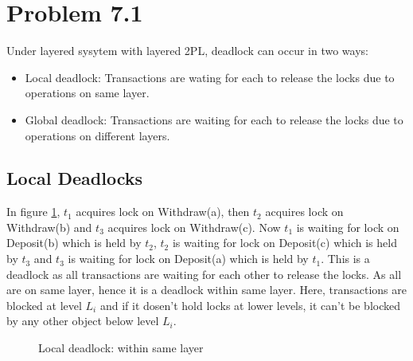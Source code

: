 \documentclass[12pt]{article}
\begin{document}
\section*{Problem 7.1}
Under layered sysytem with layered 2PL, deadlock can occur in two ways:
\begin{itemize}
    \item Local deadlock: Transactions are wating for each to release the locks due to operations on same layer.
    \item Global deadlock: Transactions are waiting for each to release the locks due to operations on different layers.
\end{itemize}
\subsection*{Local Deadlocks}
In figure \ref{fig:d1}, $t_1$ acquires lock on Withdraw(a), then $t_2$ acquires lock on Withdraw(b) and $t_3$ acquires lock on Withdraw(c).
Now $t_1$ is waiting for lock on Deposit(b) which is held by $t_2$, $t_2$ is waiting for lock on Deposit(c) which is held by $t_3$ and $t_3$ is waiting for lock on Deposit(a) which is held by $t_1$.
This is a deadlock as all transactions are waiting for each other to release the locks. As all are on same layer, hence it is a deadlock within same layer.
Here, transactions are blocked at level $L_i$ and if it dosen't hold locks at lower levels, it can't be blocked by any other object below level $L_i$.
\begin{figure}[h]
    \centering
    \caption{Local deadlock: within same layer }
    \label{fig:d1}
\end{figure}
\end{document}
